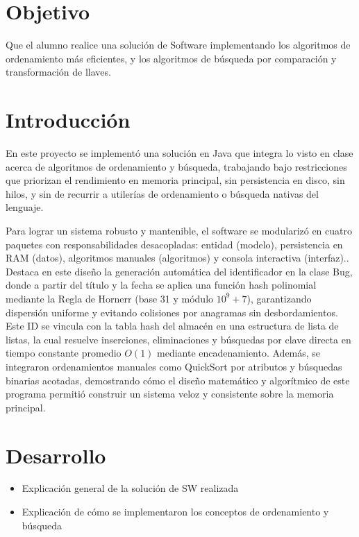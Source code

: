 \documentclass[12pt,letterpaper]{article}
\begin{document}

\section{Objetivo}
Que el alumno realice una solución de Software implementando los algoritmos de ordenamiento más eficientes, y los algoritmos de búsqueda por comparación y transformación de llaves.

\section{Introducción}
En este proyecto se implementó una solución en Java que integra lo visto en clase acerca de algoritmos de ordenamiento y búsqueda, trabajando bajo restricciones que priorizan el rendimiento en memoria principal, sin persistencia en disco, sin hilos, y sin de recurrir a utilerías de ordenamiento o búsqueda nativas del lenguaje.

Para lograr un sistema robusto y mantenible, el software se modularizó en cuatro paquetes con responsabilidades desacopladas: entidad (modelo), persistencia en RAM (datos), algoritmos manuales (algoritmos) y consola interactiva (interfaz).. Destaca en este diseño la generación automática del identificador en la clase Bug, donde a partir del título y la fecha se aplica una función hash polinomial mediante la Regla de Hornerr (base 31 y módulo $10^{9}+7$), garantizando dispersión uniforme y evitando colisiones por anagramas sin desbordamientos. Este ID se vincula con la tabla hash del almacén en una estructura de lista de listas, la cual resuelve inserciones, eliminaciones y búsquedas por clave directa en tiempo constante promedio $O(1)$ mediante encadenamiento. Además, se integraron ordenamientos manuales como QuickSort por atributos y búsquedas binarias acotadas, demostrando cómo el diseño matemático y algorítmico de este programa permitió construir un sistema veloz y consistente sobre la memoria principal.

\section{Desarrollo}
\begin{itemize}
    \item Explicación general de la solución de SW realizada
    \item Explicación de cómo se implementaron los conceptos de ordenamiento y búsqueda
\end{itemize}
\end{document}
